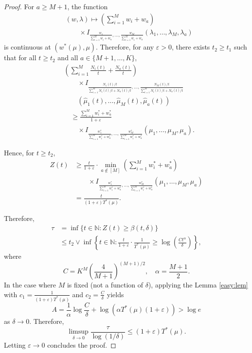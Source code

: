 \documentclass[final]{IEEEtran}
\newcommand{\nn}{\nonumber}
\begin{document}
\begin{proof}
For $a \geq M+1$, the function
\begin{align*}
&(w, \lambda) \mapsto \left(\sum_{i=1}^M w_i + w_a \right) \nn\\
&\qquad  \times I_{\frac{w_1}{\sum_{i=1}^M w_i + w_a}, \ldots, \frac{w_M}{\sum_{i=1}^M w_i + w_a}}(\lambda_1, \ldots, \lambda_M, \lambda_a)
\end{align*}
is continuous at $(w^*(\mu), \mu)$. Therefore, for any $ \varepsilon > 0$, there exists $t_2 \geq t_1$ such that for all $t \geq t_2$ and all $a \in \{M+1, \ldots, K\}$,
\begin{align}
&\left( \sum_{i=1}^M \frac{N_i(t)}{t} + \frac{N_a(t)}{t} \right) \nn \\
&\qquad \times  I_{\frac{N_1(t)/t}{\sum_{i=1}^M N_i(t)/t + N_a(t)/t}, \ldots, \frac{N_M(t)/t}{\sum_{i=1}^M N_i(t)/t + N_a(t)/t}} \nn\\
&\qquad \left( \hat{\mu}_1(t), \ldots, \hat{\mu}_M(t), \hat{\mu}_a(t) \right) \nn \\
&\quad \geq \frac{\sum_{i=1}^M w_i^* + w_a^*}{1+\varepsilon} \nn\\
&\qquad \times  I_{\frac{w_1^*}{\sum_{i=1}^M w_i^* + w_a^*}, \ldots, \frac{w_M^*}{\sum_{i=1}^M w_i^* + w_a^*}} (\mu_1, \ldots, \mu_M, \mu_a).
\end{align}

Hence, for $t \geq t_2$,
\begin{align}
Z(t) &\geq \frac{t}{1+\varepsilon} \cdot \min_{a \notin [M]} \left(\sum_{i=1}^M w_i^* + w_a^*\right) \nn\\
&\qquad \times  I_{\frac{w_1^*}{\sum_{i=1}^M w_i^* + w_a^*}, \ldots, \frac{w_M^*}{\sum_{i=1}^M w_i^* + w_a^*}} (\mu_1, \ldots, \mu_M, \mu_a) \nn\\
&= \frac{t}{(1+\varepsilon) T^*(\mu)}.
\end{align}

Therefore,
\begin{align}
\tau &= \inf \{ t \in \mathbb{N} : Z(t) \geq \beta(t, \delta) \} \nn \\
&\leq t_2 \vee \inf \left\{ t \in \mathbb{N} : \frac{t}{1+\varepsilon} \cdot \frac{1}{T^*(\mu)} \geq \log\left(\frac{C t^{\alpha}}{\delta}\right) \right\},
\end{align}
where
\[
C = K^M \left( \frac{4}{M+1} \right)^{(M+1)/2}, \quad \alpha = \frac{M+1}{2}.
\]
In the case where \( M \) is fixed (not a function of \( \delta \)), applying the Lemma \ref{easy:lem} with \( c_1 = \frac{1}{(1+\varepsilon) T^*(\mu)} \) and \( c_2 = \frac{C}{\delta} \) yields
\[
A = \frac{1}{\alpha} \log \frac{C}{\delta} + \log\left( \alpha T^*(\mu)(1+\varepsilon) \right) > \log e
\]
as \( \delta \to 0 \). Therefore,
\[
\limsup_{\delta \to 0} \frac{\tau}{\log(1/\delta)} \leq (1 + \varepsilon) T^*(\mu).
\]
Letting \( \varepsilon \to 0 \) concludes the proof.

\end{proof}
\end{document}
